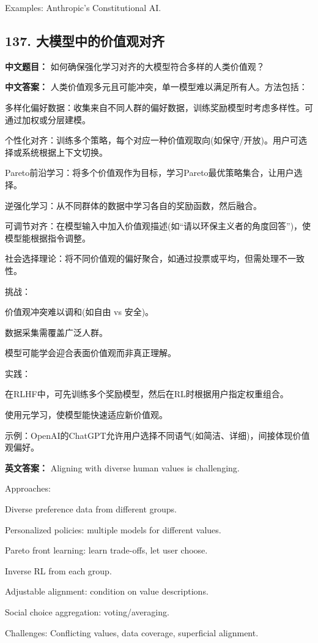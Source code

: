 \documentclass[10pt,a4paper]{ctexart}
\begin{document}
Examples: Anthropic's Constitutional AI.

\subsection*{137. 大模型中的价值观对齐}
\textbf{中文题目：} 如何确保强化学习对齐的大模型符合多样的人类价值观？

\textbf{中文答案：}
人类价值观多元且可能冲突，单一模型难以满足所有人。方法包括：

多样化偏好数据：收集来自不同人群的偏好数据，训练奖励模型时考虑多样性。可通过加权或分层建模。

个性化对齐：训练多个策略，每个对应一种价值观取向(如保守/开放)。用户可选择或系统根据上下文切换。

Pareto前沿学习：将多个价值观作为目标，学习Pareto最优策略集合，让用户选择。

逆强化学习：从不同群体的数据中学习各自的奖励函数，然后融合。

可调节对齐：在模型输入中加入价值观描述(如“请以环保主义者的角度回答”)，使模型能根据指令调整。

社会选择理论：将不同价值观的偏好聚合，如通过投票或平均，但需处理不一致性。

挑战：

价值观冲突难以调和(如自由 vs 安全)。

数据采集需覆盖广泛人群。

模型可能学会迎合表面价值观而非真正理解。

实践：

在RLHF中，可先训练多个奖励模型，然后在RL时根据用户指定权重组合。

使用元学习，使模型能快速适应新价值观。

示例：OpenAI的ChatGPT允许用户选择不同语气(如简洁、详细)，间接体现价值观偏好。

\textbf{英文答案：}
Aligning with diverse human values is challenging.

Approaches:

Diverse preference data from different groups.

Personalized policies: multiple models for different values.

Pareto front learning: learn trade-offs, let user choose.

Inverse RL from each group.

Adjustable alignment: condition on value descriptions.

Social choice aggregation: voting/averaging.

Challenges: Conflicting values, data coverage, superficial alignment.
\end{document}

